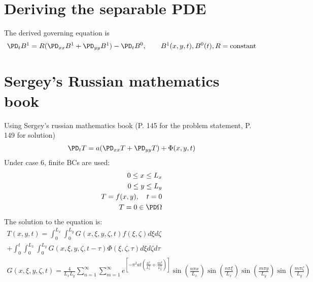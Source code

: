 \documentclass[11pt]{article}
\begin{document}
\MOONSTITLE
\maketitle
\section{Deriving the separable PDE}
The derived governing equation is
\begin{equation}\begin{aligned}
\PD_t B^1 = R (\PD_{xx} B^1 + \PD_{yy} B^1) - \PD_t B^0, \qquad B^1(x,y,t),B^0(t),R=\text{constant} \\
\end{aligned} \end{equation}
\section{Sergey's Russian mathematics book}
Using Sergey's russian mathematics book (P. 145 for the problem statement, P. 149 for solution)
\begin{equation}\begin{aligned}
\PD_t T = a (\PD_{xx} T + \PD_{yy} T) + \Phi(x,y,t) \\
\end{aligned} \end{equation}
Under case 6, finite BCs are used:
\begin{equation}\begin{aligned}
0 \le x \le L_x \\
0 \le y \le L_y \\
T = f(x,y), \quad t=0 \\
T = 0 \in \PD \Omega \\
\end{aligned} \end{equation}
The solution to the equation is:
\begin{equation}\begin{aligned}
T(x,y,t)=
\int_0^{L_x} \int_0^{L_y} G(x,\xi,y,\zeta,t) f(\xi,\zeta) d \xi d \zeta
\\ +
\int_0^t \int_0^{L_x} \int_0^{L_y} G(x,\xi,y,\zeta,t-\tau) \Phi(\xi,\zeta,\tau) d \xi d \zeta d \tau
\\
G(x,\xi,y,\zeta,t) =
\frac{4}{L_x L_y} \sum_{n=1}^{\infty} \sum_{m=1}^{\infty}
e^{\left[ -\pi^2 a t \left( \frac{n^2}{L_x^2} + \frac{m^2}{L_y^2} \right) \right]}
\sin \left( \frac{n \pi x}{L_x} \right)
\sin \left( \frac{n \pi \xi}{L_x} \right)
\sin \left( \frac{m \pi y}{L_y} \right)
\sin \left( \frac{m \pi \zeta}{L_y} \right)
\\
\end{aligned} \end{equation}
\end{document}
